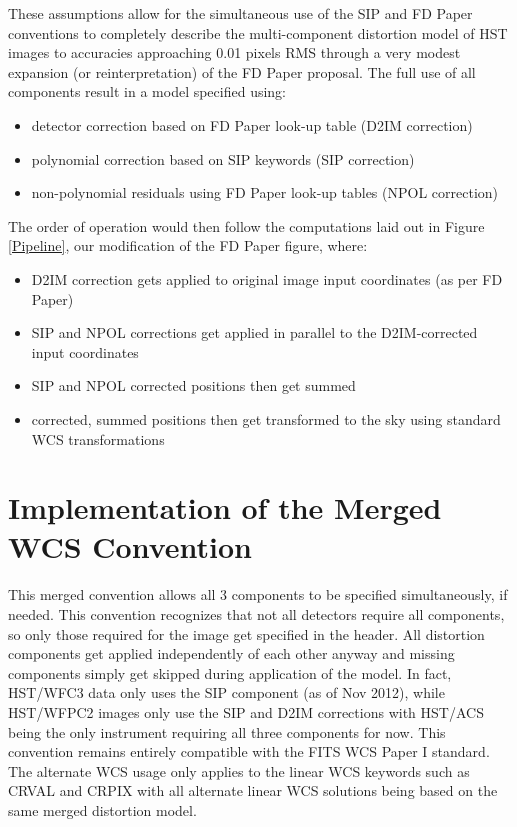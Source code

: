 These assumptions allow for the simultaneous use of the SIP and FD Paper conventions to completely describe the multi-component distortion model of HST images to accuracies approaching 0.01 pixels RMS through a very modest expansion (or reinterpretation) of the FD Paper proposal. The full use of all components result in a model specified using:
\begin{itemize}
\item detector correction based on FD Paper look-up table (D2IM correction)
\item polynomial correction based on SIP keywords (SIP correction)
\item non-polynomial residuals using FD Paper look-up tables (NPOL correction)
\end{itemize}
The order of operation would then follow the computations laid out in Figure \ref{Pipeline}, our modification of the FD Paper figure, where:
\begin{itemize}
\item D2IM correction gets applied to original image input coordinates (as per FD Paper)
\item SIP and NPOL corrections get applied in parallel to the D2IM-corrected input coordinates
\item SIP and NPOL corrected positions then get summed 
\item corrected, summed positions then get transformed to the sky using standard WCS transformations
\end{itemize}


\section{Implementation of the Merged WCS Convention}
This merged convention allows all 3 components to be specified simultaneously, if needed.  This convention recognizes that not all detectors require all components, so only those required for the image get specified in the header. All distortion components get applied independently of each other anyway and missing components simply get skipped during application of the model. In fact, HST/WFC3 data only uses the SIP component (as of Nov 2012), while HST/WFPC2 images only use the SIP and D2IM corrections with HST/ACS being the only instrument requiring all three components for now. This convention remains entirely compatible with the FITS WCS Paper I standard\citep{greisen_2002}. The alternate WCS usage only applies to the linear WCS keywords such as CRVAL and CRPIX with all alternate linear WCS solutions being based on the same merged distortion model.

